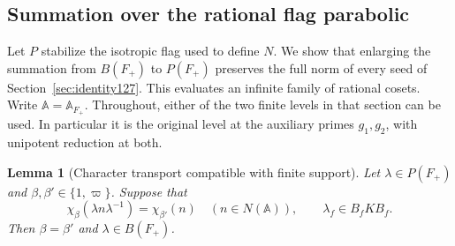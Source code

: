 \documentclass[a4paper,11pt]{article}
\newtheorem{lemma}[proposition]{Lemma}
\theoremstyle{definition}
\theoremstyle{remark}
\numberwithin{equation}{section}
\begin{document}
\subsection{Summation over the rational flag parabolic}\label{nav:VI-16}
\label{sec:parabolic129}

Let \(P\) stabilize the isotropic flag used to define \(N\).
We show that enlarging the summation from \(B(F_+)\) to
\(P(F_+)\) preserves the full norm of every seed of
Section~\ref{sec:identity127}. This evaluates an infinite family
of rational cosets. Write \(\mathbb A=\mathbb A_{F_+}\).
Throughout, either of the two finite levels in that section can
be used. In particular it is the original level at the auxiliary
primes \(g_1,g_2\), with unipotent reduction at both.

\begin{lemma}[Character transport compatible with finite support]
\label{lem:transport129}
Let \(\lambda\in P(F_+)\) and
\(\beta,\beta'\in\{1,\varpi\}\). Suppose that
\[
   \chi_\beta(\lambda n\lambda^{-1})=\chi_{\beta'}(n)
                 \quad(n\in N(\mathbb A)),\qquad
                     \lambda_f\in B_f K B_f .
\]
Then \(\beta=\beta'\) and \(\lambda\in B(F_+)\).
\end{lemma}
\end{document}
